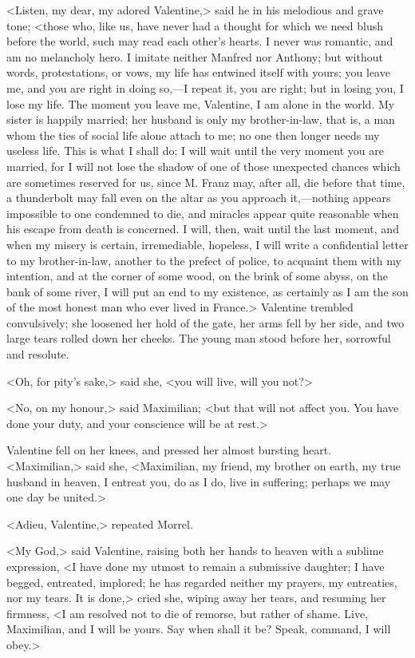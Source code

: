  <Listen, my dear, my adored Valentine,> said he in his melodious and grave tone; <those who, like us, have never had a thought for which we need blush before the world, such may read each other's hearts. I never was romantic, and am no melancholy hero. I imitate neither Manfred nor Anthony; but without words, protestations, or vows, my life has entwined itself with yours; you leave me, and you are right in doing so,—I repeat it, you are right; but in losing you, I lose my life. The moment you leave me, Valentine, I am alone in the world. My sister is happily married; her husband is only my brother-in-law, that is, a man whom the ties of social life alone attach to me; no one then longer needs my useless life. This is what I shall do; I will wait until the very moment you are married, for I will not lose the shadow of one of those unexpected chances which are sometimes reserved for us, since M. Franz may, after all, die before that time, a thunderbolt may fall even on the altar as you approach it,—nothing appears impossible to one condemned to die, and miracles appear quite reasonable when his escape from death is concerned. I will, then, wait until the last moment, and when my misery is certain, irremediable, hopeless, I will write a confidential letter to my brother-in-law, another to the prefect of police, to acquaint them with my intention, and at the corner of some wood, on the brink of some abyss, on the bank of some river, I will put an end to my existence, as certainly as I am the son of the most honest man who ever lived in France.>  Valentine trembled convulsively; she loosened her hold of the gate, her arms fell by her side, and two large tears rolled down her cheeks. The young man stood before her, sorrowful and resolute. 

 <Oh, for pity's sake,> said she, <you will live, will you not?> 

 <No, on my honour,> said Maximilian; <but that will not affect you. You have done your duty, and your conscience will be at rest.> 

 Valentine fell on her knees, and pressed her almost bursting heart. <Maximilian,> said she, <Maximilian, my friend, my brother on earth, my true husband in heaven, I entreat you, do as I do, live in suffering; perhaps we may one day be united.> 

 <Adieu, Valentine,> repeated Morrel. 

 <My God,> said Valentine, raising both her hands to heaven with a sublime expression, <I have done my utmost to remain a submissive daughter; I have begged, entreated, implored; he has regarded neither my prayers, my entreaties, nor my tears. It is done,> cried she, wiping away her tears, and resuming her firmness, <I am resolved not to die of remorse, but rather of shame. Live, Maximilian, and I will be yours. Say when shall it be? Speak, command, I will obey.> 

